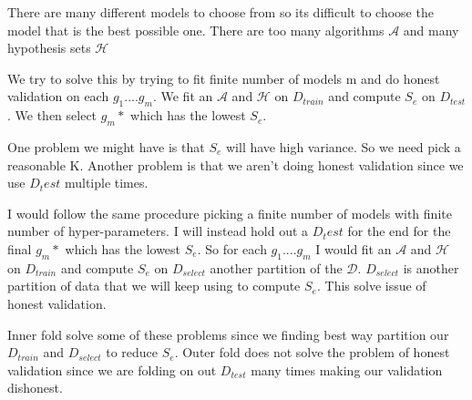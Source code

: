 \documentclass[12pt]{article}
\begin{document}

\begin{enumerate}


 There are many different models to choose from so its difficult to choose the model that is the best possible one. There are too many algorithms $\mathcal{A}$ and many hypothesis sets $\mathcal{H}$


We try to solve this by trying to fit finite number of models m and do honest validation on each $g_1$....$g_m$. We fit an $\mathcal{A}$ and $\mathcal{H}$ on $D_{train}$ and compute $S_e$ on $D_{test}$. We then select $g_m*$ which has the lowest $S_e$.


One problem we might have is that $S_e$ will have high variance. So we need pick a reasonable K. Another problem is that we aren't doing honest validation since we use $D_test$ multiple times.


I would follow the same procedure picking a finite number of models with finite number of hyper-parameters. I will instead hold out a $D_test$ for the end for the final $g_m*$ which has the lowest $S_e$. So for each $g_1$....$g_m$ I would fit an $\mathcal{A}$ and $\mathcal{H}$ on $D_{train}$ and compute $S_e$ on $D_{select}$ another partition of the $\mathcal{D}$. $D_{select}$  is another partition of data that we will keep using to compute $S_e$. This solve issue of honest validation.


Inner fold solve some of these problems since we finding best way partition our $D_{train}$ and $D_{select}$ to reduce $S_e$. Outer fold does not solve the problem of honest validation since we are folding on out $D_{test}$ many times making our validation dishonest.  

\end{enumerate}
\end{document}
